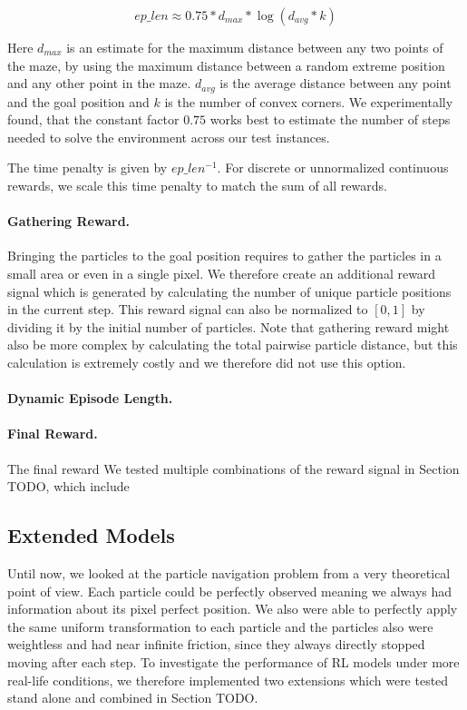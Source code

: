 \[ep\_len \approx 0.75 * d_{max} * \log (d_{avg} * k)\]

Here $d_{max}$ is an estimate for the maximum distance between any two points of the maze, by using the maximum distance between a random extreme position and any other point in the maze. $d_{avg}$ is the average distance between any point and the goal position and $k$ is the number of convex corners. We experimentally found, that the constant factor $0.75$ works best to estimate the number of steps needed to solve the environment across our test instances.

The time penalty is given by $ep\_len^{-1}$. For discrete or unnormalized continuous rewards, we scale this time penalty to match the sum of all rewards. 

\paragraph{Gathering Reward.}
Bringing the particles to the goal position requires to gather the particles in a small area or even in a single pixel. We therefore create an additional reward signal which is generated by calculating the number of unique particle positions in the current step. This reward signal can also be normalized to $[0, 1]$ by dividing it by the initial number of particles. Note that gathering reward might also be more complex by calculating the total pairwise particle distance, but this calculation is extremely costly and we therefore did not use this option.

\paragraph{Dynamic Episode Length.}

\paragraph{Final Reward.}
The final reward We tested multiple combinations of the reward signal in Section TODO, which include 



\subsection{Extended Models} \label{sec:ExtendedMaze}
Until now, we looked at the particle navigation problem from a very theoretical point of view. Each particle could be perfectly observed meaning we always had information about its pixel perfect position. We also were able to perfectly apply the same uniform transformation to each particle and the particles also were weightless and had near infinite friction, since they always directly stopped moving after each step. To investigate the performance of RL models under more real-life conditions, we therefore implemented two extensions which were tested stand alone and combined in Section TODO.

